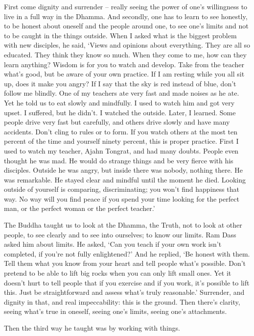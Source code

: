 First come dignity and surrender -- really seeing the power of one's
willingness to live in a full way in the Dhamma. And secondly, one has
to learn to see honestly, to be honest about oneself and the people
around one, to see one's limits and not to be caught in the things
outside. When I asked what is the biggest problem with new disciples, he
said, `Views and opinions about everything. They are all so educated.
They think they know so much. When they come to me, how can they learn
anything? Wisdom is for you to watch and develop. Take from the teacher
what's good, but be aware of your own practice. If I am resting while
you all sit up, does it make you angry? If I say that the sky is red
instead of blue, don't follow me blindly. One of my teachers ate very
fast and made noises as he ate. Yet he told us to eat slowly and
mindfully. I used to watch him and got very upset. I suffered, but he
didn't. I watched the outside. Later, I learned. Some people drive very
fast but carefully, and others drive slowly and have many accidents.
Don't cling to rules or to form. If you watch others at the most ten
percent of the time and yourself ninety percent, this is proper
practice. First I used to watch my teacher, Ajahn Tongrat, and had many
doubts. People even thought he was mad. He would do strange things and
be very fierce with his disciples. Outside he was angry, but inside
there was nobody, nothing there. He was remarkable. He stayed clear and
mindful until the moment he died. Looking outside of yourself is
comparing, discriminating; you won't find happiness that way. No way
will you find peace if you spend your time looking for the perfect man,
or the perfect woman or the perfect teacher.'

The Buddha taught us to look at the Dhamma, the Truth, not to look at
other people, to see clearly and to see into ourselves; to know our
limits. Ram Dass asked him about limits. He asked, `Can you teach if
your own work isn't completed, if you're not fully enlightened?' And he
replied, `Be honest with them. Tell them what you know from your heart
and tell people what's possible. Don't pretend to be able to lift big
rocks when you can only lift small ones. Yet it doesn't hurt to tell
people that if you exercise and if you work, it's possible to lift this.
Just be straightforward and assess what's truly reasonable.' Surrender,
and dignity in that, and real impeccability: this is the ground. Then
there's clarity, seeing what's true in oneself, seeing one's limits,
seeing one's attachments.

Then the third way he taught was by working with things.

